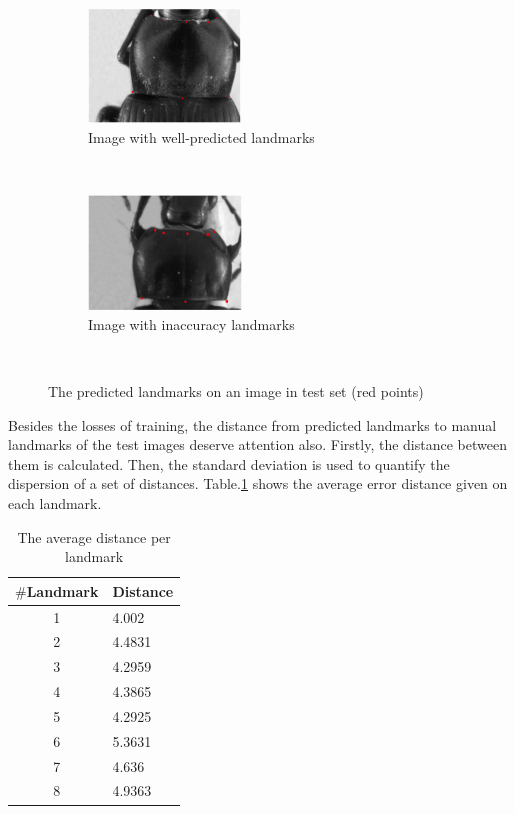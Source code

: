 \documentclass[conference]{IEEEtran}
\begin{document}
\begin{figure}
    \centering
    \begin{subfigure}[t]{0.25\textwidth}
        \centering
        \includegraphics[height=1.2in]{images/plandmark}
        \caption{Image with well-predicted landmarks}
        \label{figsub1}
    \end{subfigure}%
    ~ 
    \begin{subfigure}[t]{0.25\textwidth}
        \centering
        \includegraphics[height=1.2in]{images/plandmark2}
        \caption{Image with inaccuracy landmarks}
        \label{figsub2}
    \end{subfigure}
    \caption{The predicted landmarks on an image in test set (red points)}\
    \label{figrsexample}
\end{figure}
Besides the losses of training, the distance from predicted landmarks to manual landmarks of the test images deserve attention also. Firstly, the distance between them is calculated. Then, the standard deviation\cite{bland1996statistics} is used to quantify the dispersion of a set of distances. Table.\ref{tab2} shows the average error distance given on each landmark.

\begin{table}[htbp]
\caption{The average distance per landmark}
\begin{center}
\begin{tabular}{|c|p{1.5cm}|}
\hline
\textbf{$\#$Landmark} & \textbf{Distance} \\ \hline
1 & 4.002  \\ \hline
2 & 4.4831 \\ \hline
3 & 4.2959 \\ \hline
4 & 4.3865 \\ \hline
5 & 4.2925 \\ \hline
6 & 5.3631 \\ \hline
7 & 4.636 \\ \hline
8 & 4.9363 \\ \hline
\end{tabular}
\label{tab2}
\end{center}
\end{table}
\end{document}
